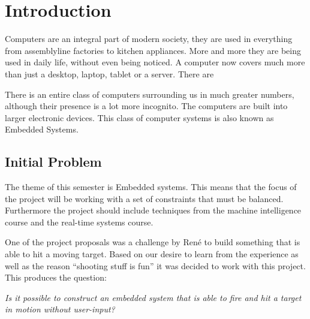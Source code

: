 \chapter{Introduction}

Computers are an integral part of modern society, they are used in everything
from assemblyline factories to kitchen appliances. More and more they are being
used in daily life, without even being noticed. A computer now covers much more
than just a desktop, laptop, tablet or a server. There are  

There is an entire class of
computers surrounding us in much greater numbers, although their presence is a
lot more incognito. The computers are built into larger electronic devices.
This class of computer systems is also known as Embedded Systems.

\section{Initial Problem}
The theme of this semester is Embedded systems. This means that the focus of
the project will be working with a set of constraints that must be balanced.
Furthermore the project should include techniques from the machine intelligence
course and the real-time systems course.\nl

One of the project proposals was a challenge by Ren\'e to build something that
is able to hit a moving target. Based on our desire to learn from the experience
as well as the reason ``shooting stuff is fun'' it was decided
to work with this project. This produces the question:\nl

\textit{Is it possible to construct an embedded system that is able to fire and hit
a target in motion without user-input?}
